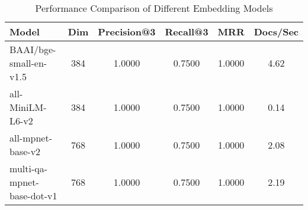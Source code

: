\begin{table}[htbp]
\caption{Performance Comparison of Different Embedding Models}
\begin{center}
\begin{tabular}{|l|c|c|c|c|c|}
\hline
\textbf{Model} & \textbf{Dim} & \textbf{Precision@3} & \textbf{Recall@3} & \textbf{MRR} & \textbf{Docs/Sec} \\ 
\hline
BAAI/bge-small-en-v1.5 & 384 & 1.0000 & 0.7500 & 1.0000 & 4.62 \\ 
all-MiniLM-L6-v2 & 384 & 1.0000 & 0.7500 & 1.0000 & 0.14 \\ 
all-mpnet-base-v2 & 768 & 1.0000 & 0.7500 & 1.0000 & 2.08 \\ 
multi-qa-mpnet-base-dot-v1 & 768 & 1.0000 & 0.7500 & 1.0000 & 2.19 \\ 
\hline
\end{tabular}
\label{tab:embedding}
\end{center}
\end{table}
